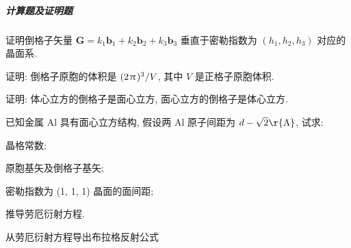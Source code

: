 \documentclass[UTF8]{ctexart}
\begin{document}
    \subparagraph{计算题及证明题}
        \begin{Question}
            \item 证明倒格子矢量 $\boldsymbol G = k_1 \boldsymbol b_1 + k_2 \boldsymbol b_2 + k_3 \boldsymbol b_3$ 垂直于密勒指数为 $(h_1, h_2, h_3)$ 对应的晶面系.
            \item 证明: 倒格子原胞的体积是 $(2 \mspace{2mu}\uppi\mspace{2mu})^3 / V$, 其中 $V$ 是正格子原胞体积.
            \item 证明: 体心立方的倒格子是面心立方, 面心立方的倒格子是体心立方.
            \item 已知金属 Al 具有面心立方结构, 假设两 Al 原子间距为 $d - \sqrt{2} \mathrm{\r{A}}$, 试求:
                \begin{Question}
                    \item 晶格常数;
                    \item 原胞基矢及倒格子基矢;
                    \item 密勒指数为 (1, 1, 1) 晶面的面间距;
                \end{Question}
            \item 推导劳厄衍射方程.
            \item 从劳厄衍射方程导出布拉格反射公式
        \end{Question}
\end{document}
